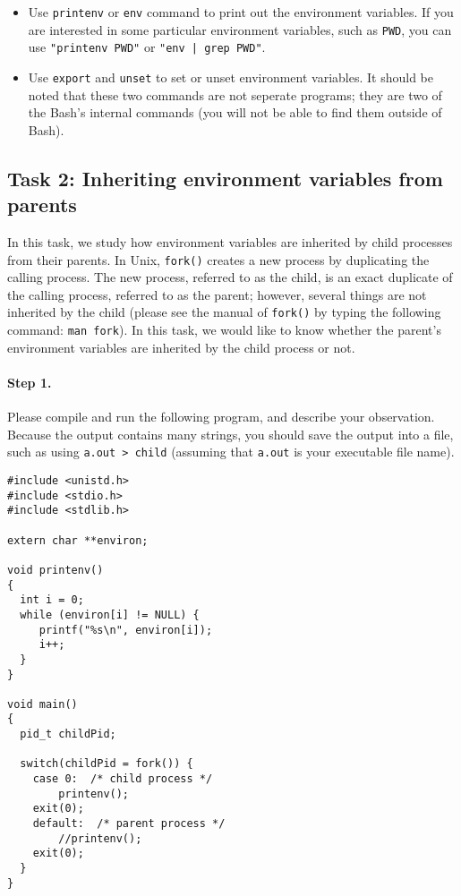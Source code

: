 \begin{itemize}
\item Use {\tt printenv} or {\tt env} command to print out the 
environment variables. If you are interested in some particular 
environment variables, such as {\tt PWD}, you can use {\tt "printenv PWD"}
or {\tt "env | grep PWD"}. 


\item Use {\tt export} and {\tt unset} to set or unset environment
variables. It should be noted that 
these two commands are not seperate programs; they are two of 
the Bash's internal commands (you will not be able to find them
outside of Bash).

\end{itemize}





\subsection{Task 2: Inheriting environment variables from parents}

In this task, we study how environment variables are inherited by 
child processes from their parents. In Unix,
{\tt fork()} creates a new process by duplicating the calling process.
The new process, referred to as the child, is an exact duplicate of the calling 
process, referred to as the parent; however, several things 
are not inherited by the child (please see the manual of {\tt fork()} by
typing the following command: {\tt man fork}). In this task,
we would like to know whether the parent's environment variables
are inherited by the child process or not.


\paragraph{Step 1.} Please compile and run the following
program,  and describe your observation. Because the output 
contains many strings, you should save the output into a file, such as
using {\tt a.out > child} (assuming that {\tt a.out} is your 
executable file name).


\begin{Verbatim}[frame=single]
#include <unistd.h>
#include <stdio.h>
#include <stdlib.h>

extern char **environ;

void printenv()
{
  int i = 0;
  while (environ[i] != NULL) {
     printf("%s\n", environ[i]);
     i++;
  }
}

void main()
{
  pid_t childPid;

  switch(childPid = fork()) {
    case 0:  /* child process */
        printenv();
	exit(0);
    default:  /* parent process */
        //printenv();
	exit(0);
  }
}
\end{Verbatim}

